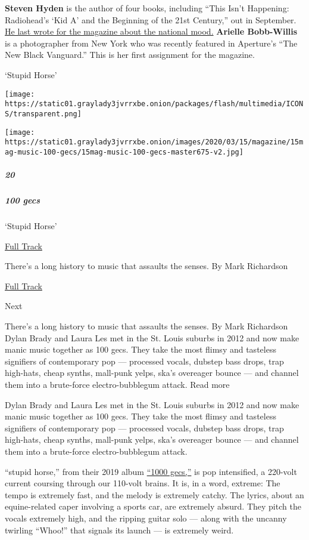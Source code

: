 \textbf{Steven Hyden} is the author of four books, including ``This
Isn't Happening: Radiohead's `Kid A' and the Beginning of the 21st
Century,'' out in September.
\href{https://www.nytimes3xbfgragh.onion/2018/07/02/magazine/national-mood-emotions-polls-online.html}{He
last wrote for the magazine about the national mood.} \textbf{Arielle
Bobb-Willis} is a photographer from New York who was recently featured
in Aperture's ``The New Black Vanguard.'' This is her first assignment
for the magazine.

`Stupid Horse'

\texttt{[image: https://static01.graylady3jvrrxbe.onion/packages/flash/multimedia/ICONS/transparent.png]}

\texttt{[image: https://static01.graylady3jvrrxbe.onion/images/2020/03/15/magazine/15mag-music-100-gecs/15mag-music-100-gecs-master675-v2.jpg]}

\hypertarget{20}{%
\subparagraph{20}\label{20}}

\hypertarget{100-gecs}{%
\subparagraph{100 gecs}\label{100-gecs}}

`Stupid Horse'

\href{https://open.spotify.com/track/23Dapn8107GgxvXDIsPwWm?si=xX4CMd6EQsC7Zst_wa121Q}{
Full Track}

There's a long history to music that assaults the senses. By Mark
Richardson

\href{https://open.spotify.com/track/23Dapn8107GgxvXDIsPwWm?si=xX4CMd6EQsC7Zst_wa121Q}{Full
Track }

Next

There's a long history to music that assaults the senses. By Mark
Richardson Dylan Brady and Laura Les met in the St. Louis suburbs in
2012 and now make manic music together as 100 gecs. They take the most
flimsy and tasteless signifiers of contemporary pop --- processed
vocals, dubstep bass drops, trap high-hats, cheap synths, mall-punk
yelps, ska's overeager bounce --- and channel them into a brute-force
electro-bubblegum attack. Read more

Dylan Brady and Laura Les met in the St. Louis suburbs in 2012 and now
make manic music together as 100 gecs. They take the most flimsy and
tasteless signifiers of contemporary pop --- processed vocals, dubstep
bass drops, trap high-hats, cheap synths, mall-punk yelps, ska's
overeager bounce --- and channel them into a brute-force
electro-bubblegum attack.

``stupid horse,'' from their 2019 album
\href{https://www.nytimes3xbfgragh.onion/2019/09/04/arts/music/100-gecs-review.html}{``1000
gecs,''} is pop intensified, a 220-volt current coursing through our
110-volt brains. It is, in a word, extreme: The tempo is extremely fast,
and the melody is extremely catchy. The lyrics, about an equine-related
caper involving a sports car, are extremely absurd. They pitch the
vocals extremely high, and the ripping guitar solo --- along with the
uncanny twirling ``Whoo!'' that signals its launch --- is extremely
weird.

